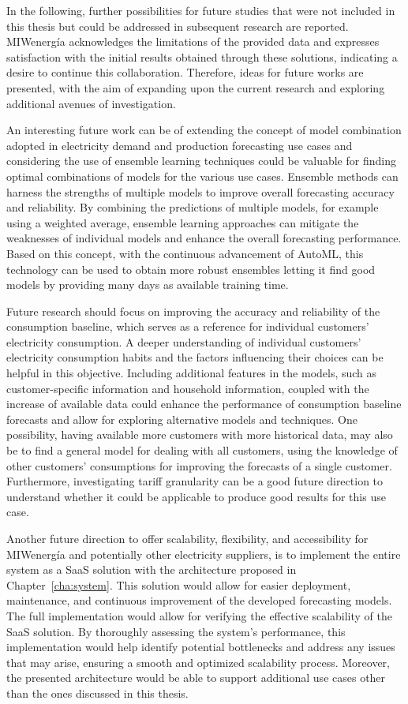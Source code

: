 In the following, further possibilities for future studies that were not included in this thesis but could be addressed in subsequent research are reported.
MIWenergía acknowledges the limitations of the provided data and expresses satisfaction with the initial results obtained through these solutions, indicating a desire to continue this collaboration.
Therefore, ideas for future works are presented, with the aim of expanding upon the current research and exploring additional avenues of investigation.

An interesting future work can be of extending the concept of model combination adopted in electricity demand and production forecasting use cases and considering the use of ensemble learning techniques could be valuable for finding optimal combinations of models for the various use cases.
Ensemble methods can harness the strengths of multiple models to improve overall forecasting accuracy and reliability.
By combining the predictions of multiple models, for example using a weighted average, ensemble learning approaches can mitigate the weaknesses of individual models and enhance the overall forecasting performance.
Based on this concept, with the continuous advancement of AutoML, this technology can be used to obtain more robust ensembles letting it find good models by providing many days as available training time.

Future research should focus on improving the accuracy and reliability of the consumption baseline, which serves as a reference for individual customers' electricity consumption.
A deeper understanding of individual customers' electricity consumption habits and the factors influencing their choices can be helpful in this objective.
Including additional features in the models, such as customer-specific information and household information, coupled with the increase of available data could enhance the performance of consumption baseline forecasts and allow for exploring alternative models and techniques.
One possibility, having available more customers with more historical data, may also be to find a general model for dealing with all customers, using the knowledge of other customers' consumptions for improving the forecasts of a single customer.
Furthermore, investigating tariff granularity can be a good future direction to understand whether it could be applicable to produce good results for this use case.

Another future direction to offer scalability, flexibility, and accessibility for MIWenergía and potentially other electricity suppliers, is to implement the entire system as a SaaS solution with the architecture proposed in Chapter~\ref{cha:system}.
This solution would allow for easier deployment, maintenance, and continuous improvement of the developed forecasting models.
The full implementation would allow for verifying the effective scalability of the SaaS solution.
By thoroughly assessing the system's performance, this implementation would help identify potential bottlenecks and address any issues that may arise, ensuring a smooth and optimized scalability process.
Moreover, the presented architecture would be able to support additional use cases other than the ones discussed in this thesis.

